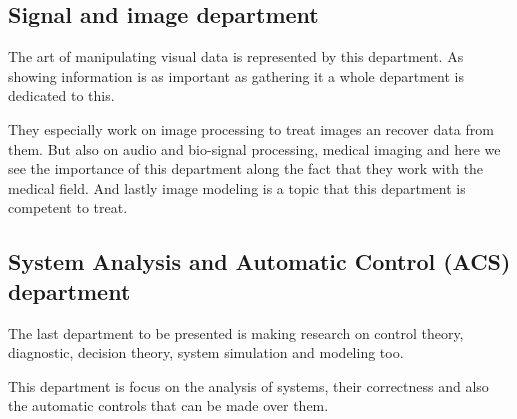 \subsection{Signal and image department}
The art of manipulating visual data is represented by this department. As showing information is as important as gathering it a whole department is dedicated to this.

They especially work on  image processing to treat images an recover data from them. But also on audio and bio-signal processing, medical imaging and here we see the importance of this department along the fact that they work with the medical field. And lastly image modeling is a topic that this department is competent to treat.
\subsection{System Analysis and Automatic Control (ACS) department}
The last department to be presented is making research on control theory, diagnostic, decision theory, system simulation and modeling too. 

This department is focus on the analysis of systems, their correctness and also the automatic controls that can be made over them.